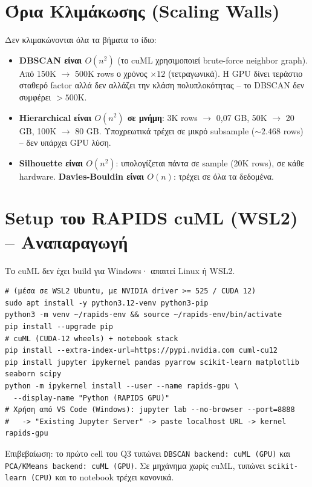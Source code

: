 \documentclass[12pt,a4paper,twoside]{book}
\begin{document}
\section{Όρια Κλιμάκωσης (Scaling Walls)}

Δεν κλιμακώνονται όλα τα βήματα το ίδιο:
\begin{itemize}
    \item \textbf{DBSCAN είναι \(O(n^2)\)} (το cuML χρησιμοποιεί
    brute-force neighbor graph). Από 150K \(\to\) 500K rows ο χρόνος
    \(\times 12\) (τετραγωνικά). Η GPU δίνει τεράστιο σταθερό factor αλλά
    δεν αλλάζει την κλάση πολυπλοκότητας -- το DBSCAN δεν συμφέρει \(>500\)K.
    \item \textbf{Hierarchical είναι \(O(n^2)\) σε μνήμη}: 3K rows \(\to\)
    0,07 GB, 50K \(\to\) 20 GB, 100K \(\to\) 80 GB. Υποχρεωτικά τρέχει σε
    μικρό subsample (\(\sim 2{.}468\) rows) -- δεν υπάρχει GPU λύση.
    \item \textbf{Silhouette είναι \(O(n^2)\)}: υπολογίζεται πάντα σε
    sample (20K rows), σε κάθε hardware. \textbf{Davies-Bouldin είναι
    \(O(n)\)}: τρέχει σε όλα τα δεδομένα.
\end{itemize}

\section{Setup του RAPIDS cuML (WSL2) -- Αναπαραγωγή}

Το cuML δεν έχει build για Windows· απαιτεί Linux ή WSL2.

\begin{tcolorbox}[myCustomStyle={WSL2 + RAPIDS cuML}]
\begin{lstlisting}[style=myBashStyle]
# (μέσα σε WSL2 Ubuntu, με NVIDIA driver >= 525 / CUDA 12)
sudo apt install -y python3.12-venv python3-pip
python3 -m venv ~/rapids-env && source ~/rapids-env/bin/activate
pip install --upgrade pip
# cuML (CUDA-12 wheels) + notebook stack
pip install --extra-index-url=https://pypi.nvidia.com cuml-cu12
pip install jupyter ipykernel pandas pyarrow scikit-learn matplotlib seaborn scipy
python -m ipykernel install --user --name rapids-gpu \
  --display-name "Python (RAPIDS GPU)"
# Χρήση από VS Code (Windows): jupyter lab --no-browser --port=8888
#   -> "Existing Jupyter Server" -> paste localhost URL -> kernel rapids-gpu
\end{lstlisting}
\end{tcolorbox}

Επιβεβαίωση: το πρώτο cell του Q3 τυπώνει \texttt{DBSCAN backend: cuML
(GPU)} και \texttt{PCA/KMeans backend: cuML (GPU)}. Σε μηχάνημα χωρίς
cuML, τυπώνει \texttt{scikit-learn (CPU)} και το notebook τρέχει κανονικά.
\end{document}
